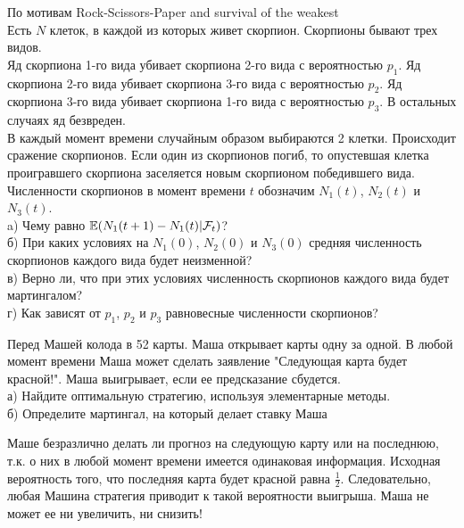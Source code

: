 \begin{problem}
По мотивам Rock-Scissors-Paper and survival of the weakest \\
Есть $N$ клеток, в каждой из которых живет скорпион. Скорпионы
бывают трех видов. \\
Яд скорпиона 1-го вида убивает скорпиона 2-го вида с вероятностью
$p_{1}$. Яд скорпиона 2-го вида убивает скорпиона 3-го вида с
вероятностью $p_{2}$. Яд скорпиона 3-го вида убивает скорпиона
1-го вида с вероятностью $p_{3}$. В остальных случаях яд
безвреден. \\
В каждый момент времени случайным образом выбираются 2 клетки.
Происходит сражение скорпионов. Если один из скорпионов погиб, то
опустевшая клетка проигравшего скорпиона заселяется новым
скорпионом победившего вида. \\
Численности скорпионов в момент времени $t$ обозначим $N_{1}(t)$,
$N_{2}(t)$ и $N_{3}(t)$. \\
a) Чему равно $\mathbb{E}(N_{1}(t+1)-N_{1}(t)|\mathcal{F}_{t})$? \\
б) При каких условиях на $N_{1}(0)$, $N_{2}(0)$ и $N_{3}(0)$
средняя численность скорпионов каждого вида будет неизменной? \\
в) Верно ли, что при этих условиях численность скорпионов каждого
вида будет мартингалом? \\
г) Как зависят от $p_{1}$, $p_{2}$ и $p_{3}$ равновесные
численности скорпионов? 
\end{problem} 
\begin{solution} 

\end{solution}

\begin{problem}
Перед Машей колода в 52 карты. Маша открывает карты одну за одной.
В любой момент времени Маша может сделать заявление "Следующая
карта будет красной!". Маша выигрывает, если ее
предсказание сбудется. \\
а) Найдите оптимальную стратегию, используя элементарные методы. \\
б) Определите мартингал, на который делает ставку Маша 
\end{problem} 
\begin{solution} 

Маше безразлично делать ли прогноз на следующую карту или на
последнюю, т.к. о них в любой момент времени имеется одинаковая
информация. Исходная вероятность того, что последняя карта будет
красной равна $\frac{1}{2}$. Следовательно, любая Машина стратегия
приводит к такой вероятности выигрыша. Маша не может ее ни
увеличить, ни снизить! 
\end{solution}

